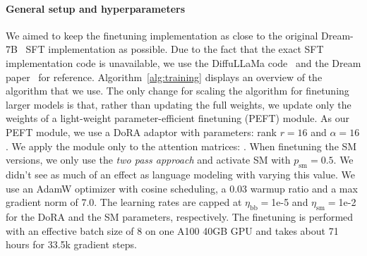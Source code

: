 \documentclass{article}
\begin{document}
\paragraph{General setup and hyperparameters}
%
We aimed to keep the finetuning implementation as close to the original Dream-7B~\citep{ye_dream_2025} SFT implementation as possible. 
%
Due to the fact that the exact SFT implementation code is unavailable, we use the DiffuLLaMa code~\citep{gong_scaling_2025} and the Dream paper~\citep{ye_dream_2025} for reference. 
%
Algorithm~\ref{alg:training} displays an overview of the algorithm that we use. 
%
The only change for scaling the algorithm for finetuning larger models is that, rather than updating the full weights, we update only the weights of a light-weight parameter-efficient finetuning (PEFT) module.
%
As our PEFT module, we use a DoRA adaptor with parameters: rank $r=16$ and $\alpha=16$. 
%
We apply the module only to the attention matrices: . 
%
When finetuning the SM versions, we only use the \emph{two pass approach} and activate SM with $p_{\text{sm}} = 0.5$. We didn't see as much of an effect as language modeling with varying this value.
%
We use an AdamW optimizer with cosine scheduling, a 0.03 warmup ratio and a max gradient norm of 7.0. 
%
The learning rates are capped at
$\eta_{\text{bb}}=$1e-5 and $\eta_{\text{sm}}=$1e-2 for the DoRA and the SM parameters, respectively.
%
The finetuning is performed with an effective batch size of 8 on one A100 40GB GPU and takes about 71 hours for 33.5k gradient steps.
\end{document}
